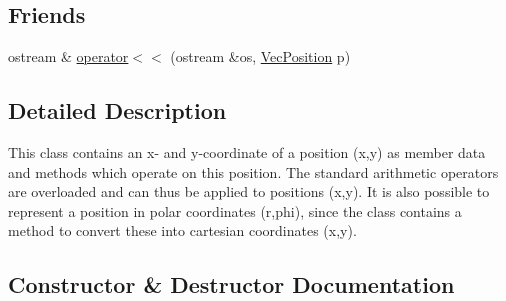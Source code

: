 \subsection*{Friends}
\begin{DoxyCompactItemize}
\item 
ostream \& \hyperlink{classVecPosition_a11e985d94783227c9dfea8d4c92656ad}{operator$<$$<$} (ostream \&os, \hyperlink{classVecPosition}{Vec\+Position} p)
\end{DoxyCompactItemize}


\subsection{Detailed Description}
This class contains an x-\/ and y-\/coordinate of a position (x,y) as member data and methods which operate on this position. The standard arithmetic operators are overloaded and can thus be applied to positions (x,y). It is also possible to represent a position in polar coordinates (r,phi), since the class contains a method to convert these into cartesian coordinates (x,y). 

\subsection{Constructor \& Destructor Documentation}

